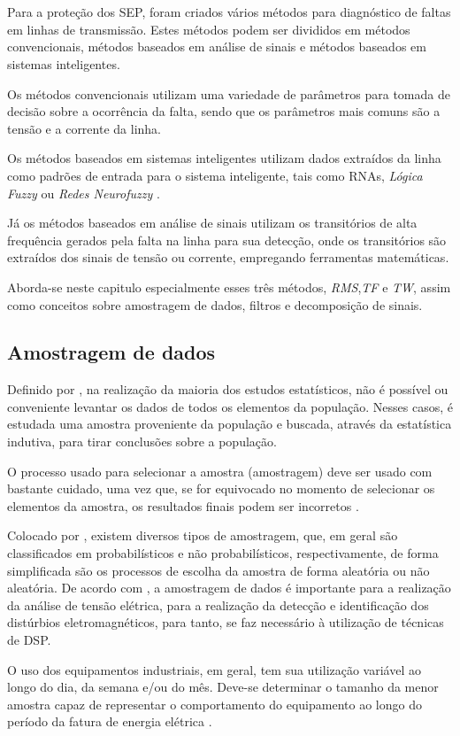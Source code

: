 \chapter{\captres}\label{analise}
\par
Para a proteção dos \ac{SEP}, foram criados vários métodos para diagnóstico de faltas em linhas de transmissão. Estes métodos podem ser divididos em métodos convencionais, métodos baseados em análise de sinais e métodos baseados em sistemas inteligentes.
\par
Os métodos convencionais utilizam uma variedade de parâmetros para tomada de decisão sobre a ocorrência da falta, sendo que os parâmetros mais comuns são a tensão e a corrente da linha. 
\par
Os métodos baseados em sistemas inteligentes utilizam dados extraídos da linha como padrões de entrada para o sistema inteligente, tais como \ac{RNAs}, \emph{Lógica Fuzzy} ou \emph{Redes Neurofuzzy} \cite{INA10}. 
\par 
Já os métodos baseados em análise de sinais utilizam os transitórios de alta frequência gerados pela falta na linha para sua detecção, onde os transitórios são extraídos dos sinais de tensão ou corrente, empregando ferramentas matemáticas. 
\par
Aborda-se neste capitulo especialmente esses três métodos, \emph{\ac{RMS}},\emph{\ac{TF}} e \emph{\ac{TW}}, assim como conceitos sobre amostragem de dados, filtros e decomposição de sinais.
\section{Amostragem de dados}
\par
Definido por \cite{SIL09}, na realização da maioria dos estudos estatísticos, não é possível ou conveniente levantar os dados de todos os elementos da população. Nesses casos, é estudada uma amostra proveniente da população e buscada, através da estatística indutiva, para tirar conclusões sobre a população.
\par
O processo usado para selecionar a amostra (amostragem) deve ser usado com bastante cuidado, uma vez que, se for equivocado no momento de selecionar os elementos da amostra, os resultados finais podem ser incorretos \cite{SIL09}. 
\par Colocado por \cite{SIL09}, existem diversos tipos de amostragem, que, em geral são classificados em probabilísticos e não probabilísticos, respectivamente, de forma simplificada são os processos de escolha da amostra de forma aleatória ou não aleatória.
De acordo com \cite{BAC11}, a amostragem de dados é importante para a realização da análise de tensão elétrica, para a realização da detecção e identificação dos distúrbios eletromagnéticos, para tanto, se faz necessário à utilização de técnicas de \ac{DSP}.
\par
O uso dos equipamentos industriais, em geral, tem sua utilização variável ao longo do dia, da semana e/ou do mês. Deve-se determinar o tamanho da menor amostra capaz de representar o comportamento do equipamento ao longo do período da fatura de energia elétrica \cite{BAC11}.
